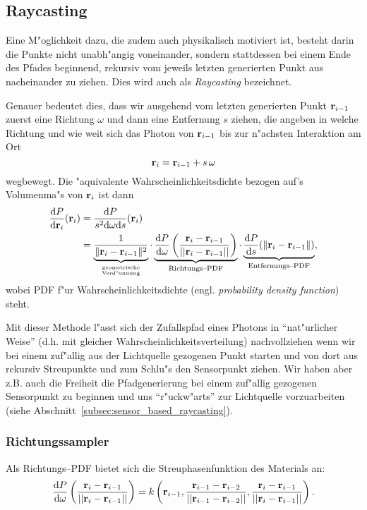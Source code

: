 	\subsection{Raycasting}
	Eine M"oglichkeit dazu, die zudem auch physikalisch motiviert ist, besteht darin die Punkte nicht unabh"angig voneinander, sondern stattdessen bei einem Ende des Pfades beginnend, rekursiv vom jeweils letzten generierten Punkt aus nacheinander zu ziehen. Dies wird auch als {\em Raycasting} bezeichnet.
	
	Genauer bedeutet dies, dass wir ausgehend vom letzten generierten Punkt $\mathbf{r}_{i-1}$ zuerst eine Richtung $\omega$ und dann eine Entfernung $s$ ziehen, die angeben in welche Richtung und wie weit sich das Photon von $\mathbf{r}_{i-1}$ bis zur n"achsten Interaktion am Ort
	$$\mathbf{r}_i=\mathbf{r}_{i-1}+s\,\omega$$
	wegbewegt.
	Die "aquivalente Wahrscheinlichkeitsdichte bezogen auf's Volumenma"s von $\mathbf{r}_i$ ist dann
	\begin{align*}
		\frac{\text{d}P}{\text{d}\mathbf{r}_i}(\mathbf{r}_i) &= \frac{\text{d}P}{s^2 \text{d}\omega\text{d}s}(\mathbf{r}_i) \\
		&= \underbrace{\frac{1}{\|\mathbf{r}_i - \mathbf{r}_{i-1}\|^2}}_{\text{geometrische}\atop\text{Verd"unnung}} \cdot\underbrace{\frac{\text{d}P}{\text{d}\omega}\left(\frac{\mathbf{r}_i - \mathbf{r}_{i-1}}{||\mathbf{r}_i - \mathbf{r}_{i-1}||}\right)}_{\text{Richtungs--PDF}} \cdot \underbrace{\frac{\text{d}P}{\text{d}s}(\|\mathbf{r}_i-\mathbf{r}_{i-1}\|)}_{\text{Entfernungs--PDF}},
	\end{align*}
	wobei PDF f"ur Wahrscheinlichkeitsdichte (engl. {\em probability density function}) steht.
	
	Mit dieser Methode l"asst sich der Zufallspfad eines Photons in ``nat"urlicher Weise'' (d.h. mit gleicher Wahrscheinlichkeitsverteilung) nachvollziehen wenn wir bei einem zuf"allig aus der Lichtquelle gezogenen Punkt starten und von dort aus rekursiv Streupunkte und zum Schlu"s den Sensorpunkt ziehen. Wir haben aber z.B. auch die Freiheit die Pfadgenerierung bei einem zuf"allig gezogenen Sensorpunkt zu beginnen und uns ``r"uckw"arts'' zur Lichtquelle vorzuarbeiten (siehe Abschnitt~\ref{subsec:sensor_based_raycasting}).
	
	\subsubsection{Richtungssampler}
	Als Richtungs--PDF bietet sich die Streuphasenfunktion des Materials an:
	\begin{equation*}
		\frac{\text{d}P}{\text{d}\omega}\left(\frac{\mathbf{r}_i - \mathbf{r}_{i-1}}{||\mathbf{r}_i - \mathbf{r}_{i-1}||}\right) = k\left(\mathbf{r}_{i-1},\frac{\mathbf{r}_{i-1} - \mathbf{r}_{i-2}}{||\mathbf{r}_{i-1} - \mathbf{r}_{i-2}||},\frac{\mathbf{r}_i - \mathbf{r}_{i-1}}{||\mathbf{r}_i - \mathbf{r}_{i-1}||}\right).
		\label{eq:direction_pdf}
	\end{equation*}
	
